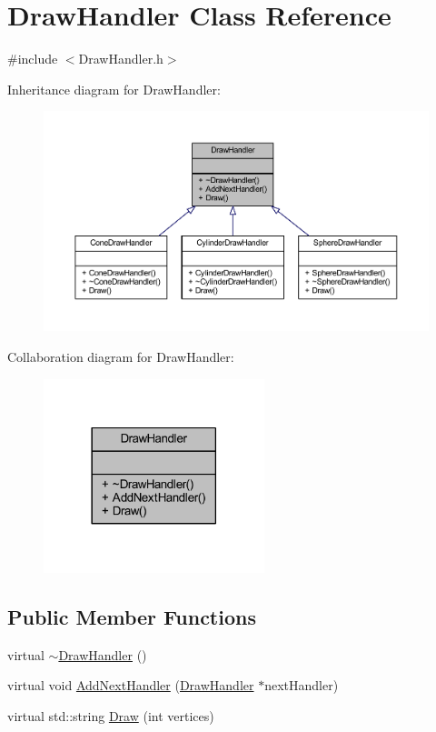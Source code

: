 \hypertarget{class_draw_handler}{}\section{Draw\+Handler Class Reference}
\label{class_draw_handler}


{\ttfamily \#include $<$Draw\+Handler.\+h$>$}



Inheritance diagram for Draw\+Handler\+:
\nopagebreak
\begin{figure}[H]
\begin{center}
\leavevmode
\includegraphics[width=350pt]{class_draw_handler__inherit__graph}
\end{center}
\end{figure}


Collaboration diagram for Draw\+Handler\+:
\nopagebreak
\begin{figure}[H]
\begin{center}
\leavevmode
\includegraphics[width=182pt]{class_draw_handler__coll__graph}
\end{center}
\end{figure}
\subsection*{Public Member Functions}
\begin{DoxyCompactItemize}
\item 
virtual \mbox{\hyperlink{class_draw_handler_a631712b3bd0cdbf327065194c5cf46f5}{$\sim$\+Draw\+Handler}} ()
\item 
virtual void \mbox{\hyperlink{class_draw_handler_ac579261b9482644c32b162b1cd2e6780}{Add\+Next\+Handler}} (\mbox{\hyperlink{class_draw_handler}{Draw\+Handler}} $\ast$next\+Handler)
\item 
virtual std\+::string \mbox{\hyperlink{class_draw_handler_af52aafccdd1397441a17a2d36174a1e4}{Draw}} (int vertices)
\end{DoxyCompactItemize}


